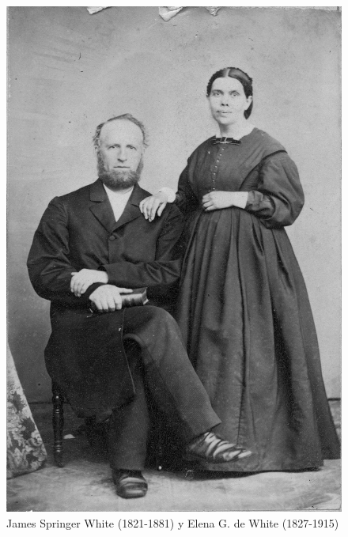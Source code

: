 \begin{figure}[hp]
    \centering
    \includegraphics[width=1\linewidth]{images/james-and-ellen-white.jpg}
    \caption*{James Springer White (1821-1881) y Elena G. de White (1827-1915)}
    \label{fig:james-and-ellen-white}
\end{figure}


